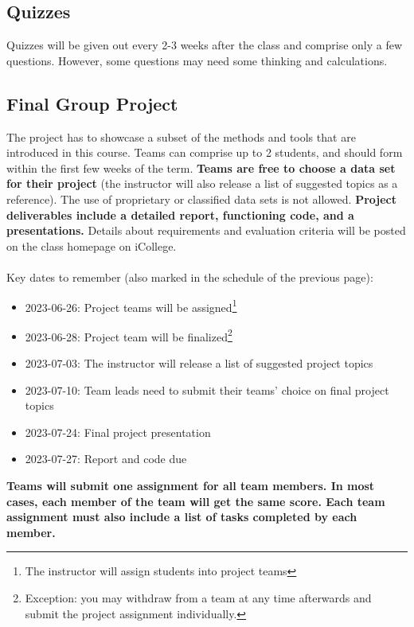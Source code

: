 \documentclass{article}
\begin{document}
\subsection{Quizzes}
Quizzes will be given out every 2-3 weeks after the class and comprise only a few questions. However, some questions may need some thinking and calculations.


\subsection{Final Group Project}
The project has to showcase a subset of the methods and tools that are introduced in this course. Teams can comprise up to 2 students, and should form within the ﬁrst few weeks of the term. \textbf{Teams are free to choose a data set for their project} (the instructor will also release a list of suggested topics as a reference). The use of proprietary or classiﬁed data sets is not allowed. \textbf{Project deliverables include a detailed report, functioning code, and a presentations.} Details about requirements and evaluation criteria will be posted on the class homepage on iCollege.\\
\\
Key dates to remember (also marked in the schedule of the previous page):\\
\begin{itemize}
	\item 2023-06-26: Project teams will be assigned\footnote{The instructor will assign students into project teams}
	\item 2023-06-28: Project team will be finalized\footnote{Exception: you may withdraw from a team at any time afterwards and submit the project assignment individually.}
	\item 2023-07-03: The instructor will release a list of suggested project topics
	\item 2023-07-10: Team leads need to submit their teams' choice on final project topics
	\item 2023-07-24: Final project presentation
	\item 2023-07-27: Report and code due
\end{itemize}

\begin{flushleft}
	\textbf{Teams will submit one assignment for all team members. In most cases, each member of the team will get the same score. Each team assignment must also include a list of tasks completed by each member.}
\end{flushleft}
\end{document}
